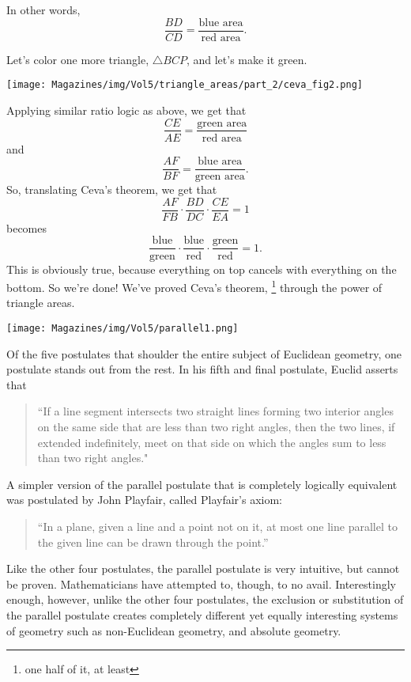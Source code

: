 \documentclass{article}
\begin{document}
\begin{multicols}{3}
In other words,
$$\frac{BD}{CD} = \frac{\text{blue area}}{\text{red area}}.$$

Let's color one more triangle, $\triangle BCP$, and let's make it green.
\begin{center}
    \centering
    \texttt{[image: Magazines/img/Vol5/triangle\_areas/part\_2/ceva\_fig2.png]}
\end{center}
Applying similar ratio logic as above, we get that
\[\frac{CE}{AE} = \frac{\text{green area}}{\text{red area}}\]
and 
\[\frac{AF}{BF} = \frac{\text{blue area}}{\text{green area}}.\]
So, translating Ceva's theorem, we get that
\[ \dfrac{AF}{FB} \cdot \dfrac{BD}{DC} \cdot \dfrac{CE}{EA} = 1\]
becomes
\[ \frac{\text{blue}}{\text{green}} \cdot \frac{\text{blue}}{\text{red}} \cdot \frac{\text{green}}{\text{red}} = 1. \]
This is obviously true, because everything on top cancels with everything on the bottom. So we're done! We've proved Ceva's theorem, \footnote{one half of it, at least} through the power of triangle areas.
\closearticle


\begin{center}
    \texttt{[image: Magazines/img/Vol5/parallel1.png]}
\end{center}
Of the five postulates that shoulder the entire subject of Euclidean geometry, one postulate stands out from the rest. In his fifth and final postulate, Euclid asserts that 

\begin{quote}
``If a line segment intersects two straight lines forming two interior angles on the same side that are less than two right angles, then the two lines, if extended indefinitely, meet on that side on which the angles sum to less than two right angles."
\end{quote}

A simpler version of the parallel postulate that is completely logically equivalent was postulated by John Playfair, called Playfair’s axiom:

\begin{quote}
“In a plane, given a line and a point not on it, at most one line parallel to the given line can be drawn through the point.”
\end{quote}

Like the other four postulates, the parallel postulate is very intuitive, but cannot be proven. Mathematicians have attempted to, though, to no avail. Interestingly enough, however, unlike the other four postulates, the exclusion or substitution of the parallel postulate creates completely different yet equally interesting systems of geometry such as non-Euclidean geometry, and absolute geometry. 


\end{multicols}
\end{document}
